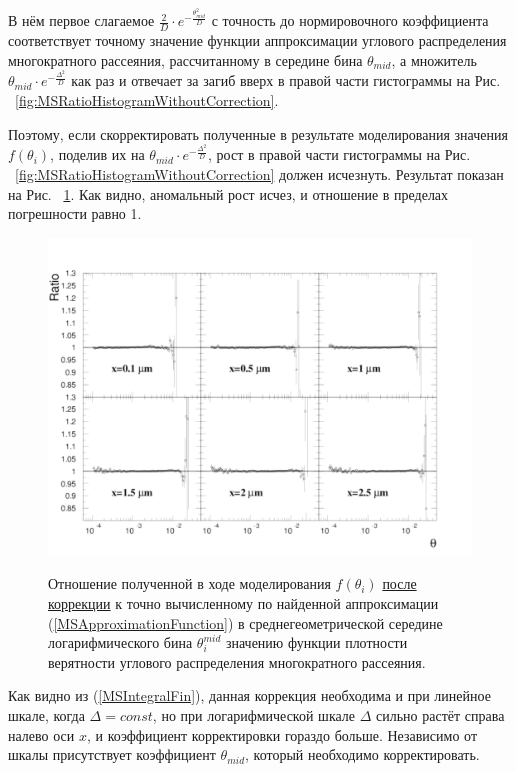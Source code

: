 \documentclass[a4paper,12pt]{article}
\begin{document}
\begin{large}
	В нём первое слагаемое $\frac{2}{D} \cdot e^{-\frac{\theta^2_{mid}}{D}}$ с точность до нормировочного коэффициента соответствует точному значение функции аппроксимации углового распределения многократного рассеяния, рассчитанному в середине бина $\theta_{mid}$, а множитель $\theta_{mid} \cdot e^{-\frac{\Delta^2}{D}}$ как раз и отвечает за загиб вверх в правой части гистограммы на Рис. ~\ref{fig:MSRatioHistogramWithoutCorrection}.
	
	Поэтому, если скорректировать полученные в результате моделирования значения $f(\theta_i)$, поделив их на $\theta_{mid} \cdot e^{-\frac{\Delta^2}{D}}$, рост в правой части гистограммы на Рис. ~\ref{fig:MSRatioHistogramWithoutCorrection} должен исчезнуть. Результат показан на Рис. ~\ref{fig:MSRatioHistogramWithCorrection}. Как видно, аномальный рост исчез, и отношение в пределах погрешности равно 1.
\begin{figure}[ht]
{
   \includegraphics[width=0.99\linewidth]{images/ratioms_with_correction.pdf}
}
\caption{Отношение полученной в ходе моделирования $f(\theta_i)$ \underline{после коррекции} к точно вычисленному по найденной аппроксимации (\ref{MSApproximationFunction}) в среднегеометрической середине логарифмического бина $\theta^{mid}_i$ значению функции плотности верятности углового распределения многократного рассеяния.}
\label{fig:MSRatioHistogramWithCorrection}
\end{figure}

	Как видно из (\ref{MSIntegralFin}), данная коррекция необходима и при линейное шкале, когда $\Delta=const$, но при логарифмической шкале $\Delta$ сильно растёт справа налево оси $x$, и коэффициент корректировки гораздо больше. Независимо от шкалы присутствует коэффициент $\theta_{mid}$, который необходимо корректировать.


\end{large}
\end{document}
